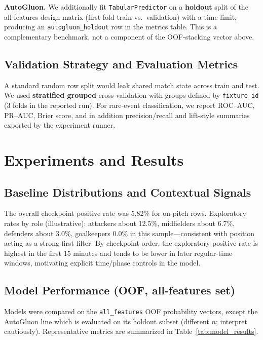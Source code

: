 \documentclass[11pt, a4paper]{article}
\begin{document}
\textbf{AutoGluon.} We additionally fit \texttt{TabularPredictor} on a \textbf{holdout} split of the all-features design matrix (first fold train vs.\ validation) with a time limit, producing an \texttt{autogluon\_holdout} row in the metrics table. This is a complementary benchmark, not a component of the OOF-stacking vector above.

\subsection{Validation Strategy and Evaluation Metrics}
A standard random row split would leak shared match state across train and test. We used \textbf{stratified grouped} cross-validation with groups defined by \texttt{fixture\_id} (3 folds in the reported run). For rare-event classification, we report ROC--AUC, PR--AUC, Brier score, and in addition precision/recall and lift-style summaries exported by the experiment runner.

\section{Experiments and Results}

\subsection{Baseline Distributions and Contextual Signals}
The overall checkpoint positive rate was 5.82\% for on-pitch rows. Exploratory rates by role (illustrative): attackers about 12.5\%, midfielders about 6.7\%, defenders about 3.0\%, goalkeepers 0.0\% in this sample—consistent with position acting as a strong first filter. By checkpoint order, the exploratory positive rate is highest in the first 15 minutes and tends to be lower in later regular-time windows, motivating explicit time/phase controls in the model.

\subsection{Model Performance (OOF, all-features set)}
Models were compared on the \texttt{all\_features} OOF probability vectors, except the AutoGluon line which is evaluated on its holdout subset (different $n$; interpret cautiously). Representative metrics are summarized in Table~\ref{tab:model_results}.
\end{document}
